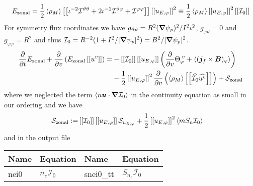\begin{align}
    E_\mathrm{zonal} = \frac{1}{2}\left \langle \rho_M \right \rangle\left[\left[  \iota^{-2}\mathcal I^{\vartheta\vartheta} + 2\iota^{-1}\mathcal I^{\vartheta\varphi} + \mathcal I^{\varphi\varphi} \right]\right] \left[\left[ u_{E,\varphi} \right]\right]^2
    \equiv \frac{1}{2} \left \langle \rho_M \right \rangle \left[\left[ u_{E,\varphi} \right]\right]^2  \left[\left[ \mathcal I_0 \right]\right]
    \label{eq:zonal_energy}
\end{align}
For symmetry flux coordinates we have $g_{\vartheta\vartheta} = R^2 ({\boldsymbol{\nabla}}\psi_p)^2/I^2\iota^2$, $g_{\varphi\vartheta} =0$ and $g_{\varphi\varphi}=R^2$ and thus $\mathcal I_0 = R^{-2}( 1 + I^2/|{\boldsymbol{\nabla}}\psi_p|^2)= B^2 / |{\boldsymbol{\nabla}}\psi_p|^2$.
\begin{align}\label{eq:perp_kinetic}
      \frac{\partial}{\partial t}E_{\mathrm{zonal}} +\frac{\partial}{\partial v } \left(E_{\mathrm{zonal}}\left[\left[ u^v \right]\right] \right)
  =&-\left[\left[ \mathcal I_0 \right]\right]\left[\left[ u_{E,\varphi} \right]\right]\left(\frac{\partial }{\partial v}  \Theta_{\varphi}^{\; v} + \left \langle ({\boldsymbol{j}}_f\times{\boldsymbol{B}})_\varphi \right \rangle\right)
  \nonumber\\
    &-\frac{1}{2}\left[\left[ u_{E,\varphi} \right]\right]^2\frac{\partial}{\partial v}\left(\left \langle \rho_M \right \rangle\left[\left[ \widehat{\mathcal I_0}\widehat{u^v} \right]\right]\right)
     + \mathcal S_{\mathrm{zonal}}
\end{align}
where we neglected the term $\left \langle n{\boldsymbol{u}}\cdot{\boldsymbol{\nabla}} \mathcal I_0 \right \rangle$ in the continuity equation as small in our ordering
 and we have
 \begin{align}
 \mathcal S_{\mathrm{zonal}} :=& \left[\left[ \mathcal I_0 \right]\right] \left[\left[ u_{E,\varphi} \right]\right] \mathcal S_{u_{E,\varphi}} + \frac{1}{2}\left[\left[ u_{E,\varphi} \right]\right]^2  \left \langle mS_n\mathcal I_0 \right \rangle
 \label{eq:zonal_source}
 \end{align}
 and in the output file
\begin{longtable}{llll}
\toprule
\rowcolor{gray!50}\textbf{Name} &  \textbf{Equation} &
\textbf{Name} &  \textbf{Equation}\\
\midrule
    nei0 &$n_e \mathcal I_0$ &
    snei0\_tt & $S_{n_e } \mathcal I_0$ \\
\bottomrule
\end{longtable}

